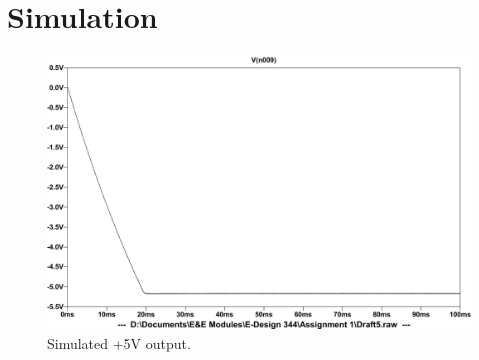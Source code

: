 \section{Simulation} \label{sec:simulation_chargepump}
\begin{figure} 
 \centering
  	\includegraphics[width=0.6\linewidth]{./Figures/chargepump_simulate.pdf}
  	\caption{Simulated +5V output.}
  	\label{fig:-5v_simulation}
 \end{figure}
 
 
